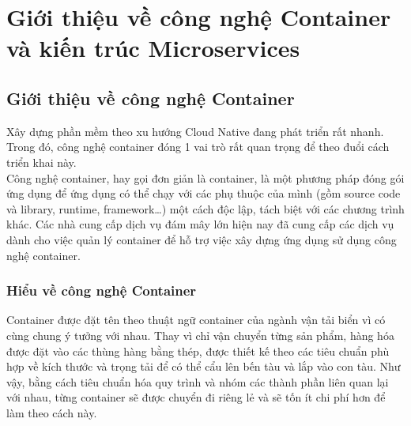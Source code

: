 \documentclass[14pt,a4paper]{report}
\begin{document}
	\hspace{0.3cm}{Ngày nay, Kubernetes đã trở thành một trong những công cụ quản lý container phổ biến nhất. Điều này là do sự phát triển mạnh mẽ của Kubernetes, cũng như sự phổ biến của container. Trong các doanh nghiệp hiện nay, Kubernetes là một phần không thể thiếu được sử dụng để quản lý các ứng dụng container, cung cấp các dịch vụ như load balancing, autoscaling, logging, monitoring, backup và restore, cũng như quản lý các tài nguyên của các ứng dụng như CPU, Memory, Storage, Network. Tuy nhiên, việc sử dụng Kubernetes cũng có những hạn chế, đặc biệt là trong việc quản lý các cấu hình nhạy cảm của ứng dụng và các tài nguyên của ứng dụng.\\}
	
	\hspace{0.3cm}{Đi cùng với sự phát triển lớn mạnh của kiến trúc Microservices cũng như Kubernetes đó là nhu cầu về việc đảm bảo tính an toàn cho các hệ thống này. Nhận thấy tầm quan trọng, thực tiễn và tính cấp thiết của sự bảo mật trong kiến trúc này, chúng em đã thực hiện báo cáo về giải pháp đảm bảo an toàn cho Microservices bằng Consul Service Mesh.}
	
	\chapter{Giới thiệu về công nghệ Container và kiến trúc Microservices}
	\setcounter{page}{1}
	\section{Giới thiệu về công nghệ Container}
	\smallskip
	\hspace{1cm}Xây dựng phần mềm theo xu hướng Cloud Native đang phát triển rất nhanh. Trong đó, công nghệ container đóng 1 vai trò rất quan trọng để theo đuổi cách triển khai này.\\
	
	\hspace{0.3cm}Công nghệ container, hay gọi đơn giản là container, là một phương pháp đóng gói ứng dụng để ứng dụng có thể chạy với các phụ thuộc của mình (gồm source code và library, runtime, framework…) một cách độc lập, tách biệt với các chương trình khác. Các nhà cung cấp dịch vụ đám mây lớn hiện nay đã cung cấp các dịch vụ dành cho việc quản lý container để hỗ trợ việc xây dựng ứng dụng sử dụng công nghệ container.
	\subsection{Hiểu về công nghệ Container}
	\hspace{1cm}Container được đặt tên theo thuật ngữ container của ngành vận tải biển vì có cùng chung ý tưởng với nhau. Thay vì chỉ vận chuyển từng sản phẩm, hàng hóa được đặt vào các thùng hàng bằng thép, được thiết kế theo các tiêu chuẩn phù hợp về kích thước và trọng tải để có thể cẩu lên bến tàu và lắp vào con tàu. Như vậy, bằng cách tiêu chuẩn hóa quy trình và nhóm các thành phần liên quan lại với nhau, từng container sẽ được chuyển đi riêng lẻ và sẽ tốn ít chi phí hơn để làm theo cách này.\\
	
\end{document}
